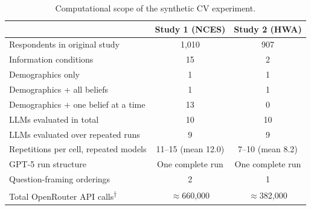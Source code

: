 % 
%

\begin{table}[h]
    \centering
    \caption{Computational scope of the synthetic CV experiment.}
    \label{tab:compute}
    \begin{threeparttable}
        \begin{tabular}{lcc}
            \toprule
                & Study 1 (NCES) & Study 2 (HWA) \\
            \midrule

            Respondents in original study
                & 1{,}010
                & 907 \\

            Information conditions
                & 15
                & 2 \\

            \quad Demographics only
                & 1
                & 1 \\

            \quad Demographics + all beliefs
                & 1
                & 1 \\

            \quad Demographics + one belief at a time
                & 13
                & 0 \\

            LLMs evaluated in total
                & 10
                & 10 \\

            LLMs evaluated over repeated runs
                & 9
                & 9 \\

            Repetitions per cell, repeated models
                & 11--15 (mean 12.0)
                & 7--10 (mean 8.2) \\

            GPT-5 run structure
                & One complete run
                & One complete run \\

            Question-framing orderings
                & 2
                & 1 \\

            Total OpenRouter API calls\textsuperscript{$\dagger$}
                & $\approx$660{,}000
                & $\approx$382{,}000 \\


\end{tabular}
\end{threeparttable}
\end{table}

